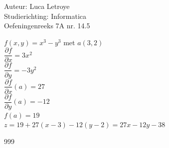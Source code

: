 \documentclass[a4paper]{article}
\begin{document}
  
\noindent \large Auteur: Luca Letroye \\
\noindent \large Studierichting: Informatica\\
\noindent \large Oefeningenreeks 7A nr. 14.5\\

\medskip
\normalsize

$f(x,y) = x^3-y^3$ met $a(3,2)$\\

$\dfrac{\partial f}{\partial x} = 3x^2$\\

$\dfrac{\partial f}{\partial y} = -3y^2$\\

$\dfrac{\partial f}{\partial x}(a) = 27$\\

$\dfrac{\partial f}{\partial y}(a) = -12$\\

$f(a) = 19$\\

$z = 19+27(x-3) - 12(y-2) = 27x-12y-38$\\




\begin{thebibliography}{999}
\end{thebibliography}
\end{document}
